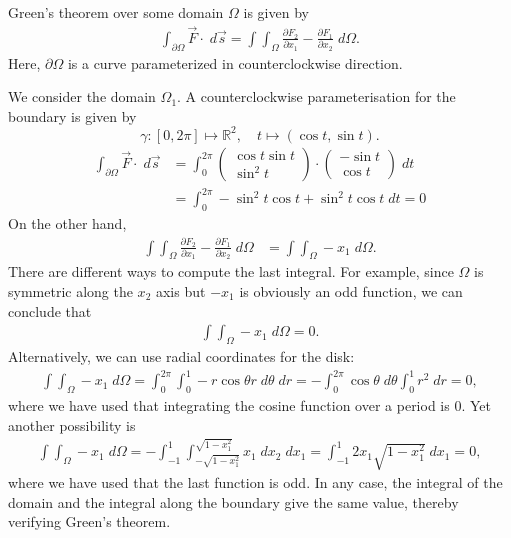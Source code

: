 \documentclass[11pt]{article}
\begin{document}
\begin{solution}   
   Green's theorem over some domain $\Omega$ is given by 
   \begin{gather*}
        \int_{\partial \Omega} \vec{F} \cdot \;d\vec{s} 
        = 
        \int \int_{\Omega} \frac{\partial F_2}{\partial x_1} - \frac{\partial F_1}{\partial x_2} \;d \Omega
        .
    \end{gather*}
    Here, $\partial\Omega$ is a curve parameterized in counterclockwise direction. 
    
    We consider the domain $\Omega_1$. 
    A counterclockwise parameterisation for the boundary is given by 
    $$
        \gamma: [0,2\pi] \mapsto \mathbb{R}^2, \quad t\mapsto  (\cos t, \sin t)
        .
    $$
    \begin{align*}
        \int_{\partial \Omega} \vec{F} \cdot \;d\vec{s} 
        &= 
        \int_0^ {2\pi} 
        \begin{pmatrix} \cos t \sin t\\ \sin^2 t \end{pmatrix} 
        \cdot 
        \begin{pmatrix} -\sin t \\ \cos t \end{pmatrix} \; d t 
        \\&= 
        \int_0^{2\pi} -\sin^2 t\cos t + \sin^ 2 t \cos t \;dt = 0
    \end{align*}
    On the other hand, 
    \begin{align*}
        \int \int_{\Omega} \frac{\partial F_2}{\partial x_1} - \frac{\partial F_1}{\partial x_2} \;d \Omega &= \int \int_{\Omega} -x_1 \; d\Omega.
    \end{align*}
    There are different ways to compute the last integral. 
	For example, since $\Omega$ is symmetric along the $x_2$ axis but $-x_1$ is obviously an odd function,
	we can conclude that 
	\begin{align*}
        \int \int_{\Omega} -x_1 \; d\Omega = 0.
    \end{align*}
	Alternatively, we can use radial coordinates for the disk: 
    \begin{align*}
        \int \int_{\Omega} -x_1 \; d\Omega
		= 
		\int_0^ {2\pi} \int_0^1 -r\cos \theta r \;d\theta\;dr
        = 
		-\int_0^ {2\pi} \cos \theta \;d \theta \int_0^1 r^ 2 \;d r = 0,
    \end{align*}
    where we have used that integrating the cosine function over a period is $0$. 
	Yet another possibility is 
	\begin{align*}
        \int \int_{\Omega} -x_1 \; d\Omega
		= 
		-
		\int_{-1}^{1} \int_{-\sqrt{1-x_1^2}}^{\sqrt{1-x_1^2}}
		x_1 \;dx_2 \;dx_1
        = 
		\int_{-1}^{1} 
		2x_1 \sqrt{1-x_1^2} \;dx_1
        =
		0
		,
    \end{align*}
	where we have used that the last function is odd. 
	In any case, the integral of the domain and the integral along the boundary give the same value, 
	thereby verifying Green's theorem.
    

\end{solution}
\end{document}
